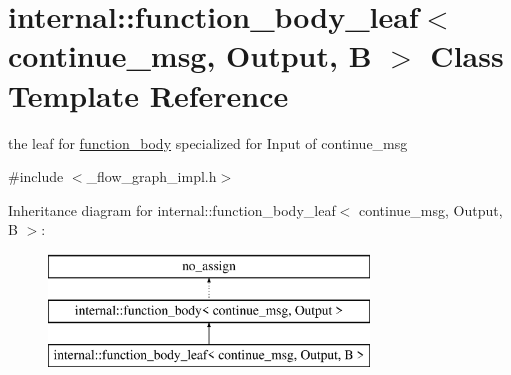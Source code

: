 \hypertarget{classinternal_1_1function__body__leaf_3_01continue__msg_00_01Output_00_01B_01_4}{}\section{internal\+:\+:function\+\_\+body\+\_\+leaf$<$ continue\+\_\+msg, Output, B $>$ Class Template Reference}
\label{classinternal_1_1function__body__leaf_3_01continue__msg_00_01Output_00_01B_01_4}


the leaf for \hyperlink{classinternal_1_1function__body}{function\+\_\+body} specialized for Input of continue\+\_\+msg  




{\ttfamily \#include $<$\+\_\+flow\+\_\+graph\+\_\+impl.\+h$>$}

Inheritance diagram for internal\+:\+:function\+\_\+body\+\_\+leaf$<$ continue\+\_\+msg, Output, B $>$\+:\begin{figure}[H]
\begin{center}
\leavevmode
\includegraphics[height=3.000000cm]{classinternal_1_1function__body__leaf_3_01continue__msg_00_01Output_00_01B_01_4}
\end{center}
\end{figure}
